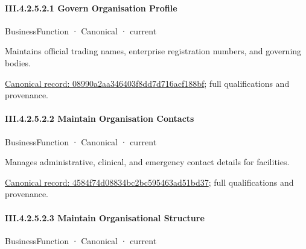 \paragraph*{III.4.2.5.2.1 Govern Organisation Profile}
\label{navigation:III.4.2.5.2.1}

\label{element:08990a2aa346403f8dd7d716acf188bf}
{\small BusinessFunction · Canonical · current}\par

Maintains official trading names, enterprise registration numbers, and governing bodies.


{\footnotesize \href{../../../../../../../continuum/business/business-function/08990a2aa346403f8dd7d716acf188bf.md}{Canonical record: 08990a2aa346403f8dd7d716acf188bf}; full qualifications and provenance.}\par
\paragraph*{III.4.2.5.2.2 Maintain Organisation Contacts}
\label{navigation:III.4.2.5.2.2}

\label{element:4584f74d08834bc2bc595463ad51bd37}
{\small BusinessFunction · Canonical · current}\par

Manages administrative, clinical, and emergency contact details for facilities.


{\footnotesize \href{../../../../../../../continuum/business/business-function/4584f74d08834bc2bc595463ad51bd37.md}{Canonical record: 4584f74d08834bc2bc595463ad51bd37}; full qualifications and provenance.}\par
\paragraph*{III.4.2.5.2.3 Maintain Organisational Structure}
\label{navigation:III.4.2.5.2.3}

\label{element:5ae4edf0813f4a738fdb3160f3e77b0d}
{\small BusinessFunction · Canonical · current}\par


